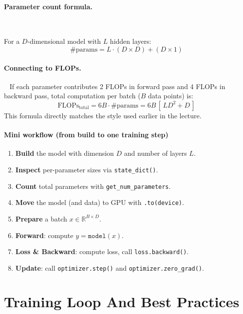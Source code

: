     
\paragraph{Parameter count formula.}~{}

For a $D$-dimensional model with $L$ hidden layers:
\[
\#\text{params} = L \cdot (D \times D) + (D \times 1)
\]


\paragraph{Connecting to FLOPs.}~{}
If each parameter contributes 2 FLOPs in forward pass and 4 FLOPs in backward pass,  
total computation per batch ($B$ data points) is:
\[
\text{FLOPs}_{\text{total}} 
= 6B \cdot \#\text{params} 
= 6B \,[\,L D^2 + D\,]
\]
This formula directly matches the style used earlier in the lecture.

\paragraph{Mini workflow (from build to one training step)}
\begin{enumerate}
    \item \textbf{Build} the model with dimension $D$ and number of layers $L$.
    \item \textbf{Inspect} per-parameter sizes via \texttt{state\_dict()}.
    \item \textbf{Count} total parameters with \texttt{get\_num\_parameters}.
    \item \textbf{Move} the model (and data) to GPU with \texttt{.to(device)}.
    \item \textbf{Prepare} a batch $x \in \mathbb{R}^{B \times D}$.
    \item \textbf{Forward}: compute $y = \texttt{model}(x)$.
    \item \textbf{Loss \& Backward}: compute loss, call \texttt{loss.backward()}.
    \item \textbf{Update}: call \texttt{optimizer.step()} and \texttt{optimizer.zero\_grad()}.
\end{enumerate}


\clearpage
{\chaptoc\noindent\begin{minipage}[inner sep=0,outer sep=0]{0.9\linewidth}\section{Training Loop And Best Practices}
\end{minipage}}

